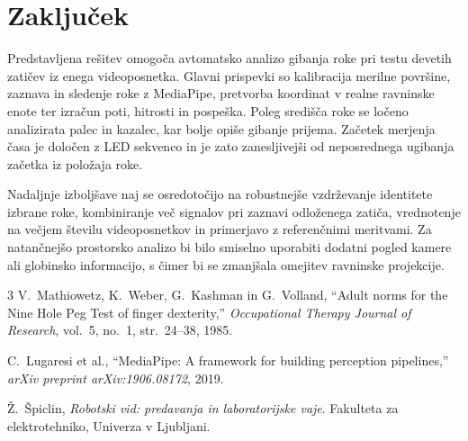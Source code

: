 \documentclass[journal,a4paper,twoside]{sty/IEEEtran}
\begin{document}
\section{Zaključek}

Predstavljena rešitev omogoča avtomatsko analizo gibanja roke pri testu devetih zatičev iz enega videoposnetka. Glavni prispevki so kalibracija merilne površine, zaznava in sledenje roke z MediaPipe, pretvorba koordinat v realne ravninske enote ter izračun poti, hitrosti in pospeška. Poleg središča roke se ločeno analizirata palec in kazalec, kar bolje opiše gibanje prijema. Začetek merjenja časa je določen z LED sekvenco in je zato zanesljivejši od neposrednega ugibanja začetka iz položaja roke.

Nadaljnje izboljšave naj se osredotočijo na robustnejše vzdrževanje identitete izbrane roke, kombiniranje več signalov pri zaznavi odloženega zatiča, vrednotenje na večjem številu videoposnetkov in primerjavo z referenčnimi meritvami. Za natančnejšo prostorsko analizo bi bilo smiselno uporabiti dodatni pogled kamere ali globinsko informacijo, s čimer bi se zmanjšala omejitev ravninske projekcije.

\begin{thebibliography}{3}
V.~Mathiowetz, K.~Weber, G.~Kashman in G.~Volland, ``Adult norms for the Nine Hole Peg Test of finger dexterity,'' {\em Occupational Therapy Journal of Research}, vol.~5, no.~1, str.~24--38, 1985.

C.~Lugaresi et al., ``MediaPipe: A framework for building perception pipelines,'' {\em arXiv preprint arXiv:1906.08172}, 2019.

Ž.~Špiclin, {\em Robotski vid: predavanja in laboratorijske vaje}. Fakulteta za elektrotehniko, Univerza v Ljubljani.
\end{thebibliography}

\vfill

\label{finish}
\end{document}
